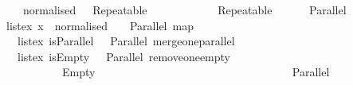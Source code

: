 \ \ \ \ \ \ \ \ \ \ {\isasymnot}\ normalised\ \ \ Repeatable\ \ {\isacharparenleft}\ \isanewline
\ \ \ \ \ \ \ \ \ Repeatable\ \ \isanewline
\ \ {\isacharbar}\ {\isachardoublequoteopen}\ {\isacharparenleft}Parallel\ \ {\isacharequal}\isanewline
\ \ \ \ \ \ {\isacharparenleft}\ \ list{\isacharunderscore}ex\ {\isacharparenleft}{\isasymlambda}x{\isachardot}\ {\isasymnot}\ normalised\ \ \ \ Parallel\ {\isacharparenleft}map\ \ \hfill{}\isanewline
\ \ \ \ \ \ \ \ \ \ list{\isacharunderscore}ex\ is{\isacharunderscore}Parallel\ \ \ Parallel\ {\isacharparenleft}merge{\isacharunderscore}one{\isacharunderscore}parallel\ \hfill{}\isanewline
\ \ \ \ \ \ \ \ \ \ list{\isacharunderscore}ex\ is{\isacharunderscore}Empty\ \ \ Parallel\ {\isacharparenleft}remove{\isacharunderscore}one{\isacharunderscore}empty\ \hfill{}\isanewline
\ \ \ \ \ \ \ \ \ {\isacharparenleft}\ \ \isanewline
\ \ \ \ \ \ \ \ \ \ \ \ \ \ \ \ {\isacharbrackleft}{\isacharbrackright}\ {\isasymRightarrow}\ Empty\hfill{}\isanewline
\ \ \ \ \ \ \ \ \ \ \ \ \ \ {\isacharbar}\ {\isacharbrackleft}\ {\isasymRightarrow}\ \hfill{}\isanewline
\ \ \ \ \ \ \ \ \ \ \ \ \ \ {\isacharbar}\ {\isacharunderscore}\ {\isasymRightarrow}\ Parallel\ \hfill{}%
